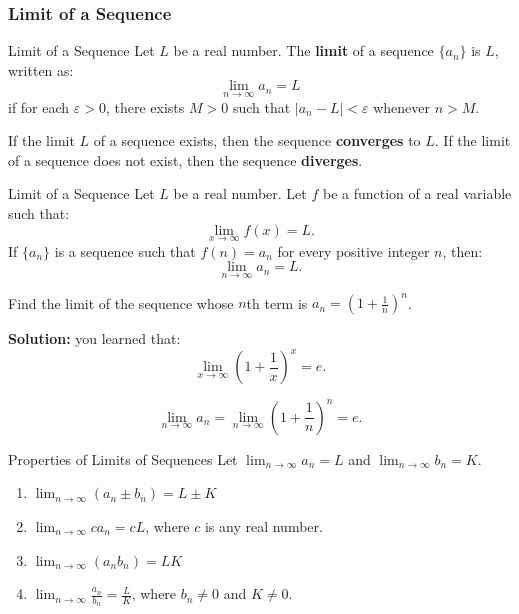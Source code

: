 \documentclass[12pt]{article}
\theoremstyle{beautifulthm}
\begin{document}
\subsubsection{Limit of a Sequence}

\begin{Definition}{Limit of a Sequence}{}
    Let $L$ be a real number. The \textbf{limit} of a sequence $\{a_n\}$ is $L$, written as:
\[
\lim_{n \to \infty} a_n = L
\]
if for each $\varepsilon > 0$, there exists $M > 0$ such that $\lvert a_n - L \rvert < \varepsilon$ whenever $n > M$. 

If the limit $L$ of a sequence exists, then the sequence \textbf{converges} to $L$. If the limit of a sequence does not exist, then the sequence \textbf{diverges}.
\end{Definition}


\begin{mytheorem}{Limit of a Sequence}{}
    Let $L$ be a real number. Let $f$ be a function of a real variable such that:
\[
\lim_{x \to \infty} f(x) = L.
\]
If $\{a_n\}$ is a sequence such that $f(n) = a_n$ for every positive integer $n$, then:
\[
\lim_{n \to \infty} a_n = L.
\]
\end{mytheorem}

\begin{tcolorbox}[colback=examplebg, colframe=red!75!black, title=\textbf{EXAMPLE 2: Finding the Limit of a Sequence}, fonttitle=\bfseries, sharp corners]

Find the limit of the sequence whose $n$th term is $a_n = \left(1 + \frac{1}{n}\right)^n$.

\tcblower
\textbf{Solution:} 
you learned that:
\[
\lim_{x \to \infty} \left(1 + \frac{1}{x}\right)^x = e.
\]



\[
\lim_{n \to \infty} a_n = \lim_{n \to \infty} \left(1 + \frac{1}{n}\right)^n = e.
\]
\end{tcolorbox}



\begin{mytheorem}{Properties of Limits of Sequences}{}
    Let $\lim_{n \to \infty} a_n = L$ and $\lim_{n \to \infty} b_n = K$.

\begin{enumerate}
    \item $\lim_{n \to \infty} (a_n \pm b_n) = L \pm K$
    \item $\lim_{n \to \infty} c a_n = cL$, where $c$ is any real number.
    \item $\lim_{n \to \infty} (a_n b_n) = LK$
    \item $\lim_{n \to \infty} \frac{a_n}{b_n} = \frac{L}{K}$, where $b_n \neq 0$ and $K \neq 0$.
\end{enumerate}
\end{mytheorem}
\end{document}
